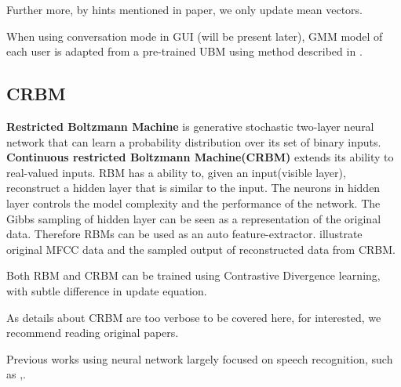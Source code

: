 Further more, by hints mentioned in paper, we only update mean vectors.

When using conversation mode in GUI (will be present later),
GMM model of each user is adapted from a pre-trained UBM
using method described in \cite{reynolds2000speaker}.

\subsection{CRBM}

\textbf{Restricted Boltzmann Machine} is generative stochastic
two-layer neural network that can learn a probability distribution
over its set of binary inputs\cite{rbm_wiki}.  \textbf{Continuous
restricted Boltzmann Machine(CRBM)}\cite{chen2003continuous} extends
its ability to real-valued inputs.  RBM has a ability to, given an
input(visible layer), reconstruct a hidden layer that is similar
to the input.  The neurons
in hidden layer controls the model complexity and the performance of
the network. The Gibbs sampling of hidden layer can be seen as a
representation of the original data. Therefore RBMs can be used
as an auto feature-extractor.
 illustrate original MFCC data and the
sampled output of reconstructed data from CRBM.

Both RBM and CRBM can be trained using Contrastive Divergence learning,
with subtle difference in update equation.

As details about CRBM are too verbose to be covered here, for interested,
we recommend reading original papers.

Previous works using neural network largely focused on speech
recognition, such as \cite{deep},\cite{mohamed2011deep}.

